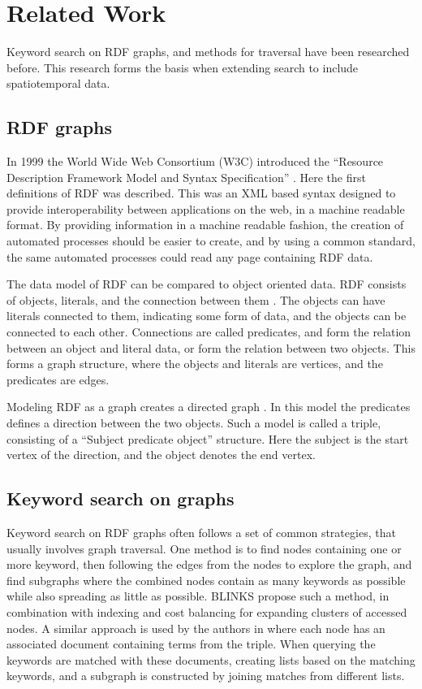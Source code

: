 \chapter{Related Work}
\label{cha:related_work}
Keyword search on RDF graphs, and methods for traversal have been researched before. This research forms the basis when extending search to include spatiotemporal data.

\section{RDF graphs}
In 1999 the World Wide Web Consortium (W3C) introduced the ``Resource Description Framework Model and Syntax Specification'' \cite{brickley1999resource}. Here the first definitions of RDF was described. This was an XML based syntax designed to provide interoperability between applications on the web, in a machine readable format. By providing information in a machine readable fashion, the creation of automated processes should be easier to create, and by using a common standard, the same automated processes could read any page containing RDF data.

The data model of RDF can be compared to object oriented data. RDF consists of objects, literals, and the connection between them \cite{decker2000framework}. The objects can have literals connected to them, indicating some form of data, and the objects can be connected to each other. Connections are called predicates, and form the relation between an object and literal data, or form the relation between two objects. This forms a graph structure, where the objects and literals are vertices, and the predicates are edges.

Modeling RDF as a graph creates a directed graph \cite{mcbride2002jena}. In this model the predicates defines a direction between the two objects. Such a model is called a triple, consisting of a ``Subject predicate object'' structure\cite{decker2000framework}. Here the subject is the start vertex of the direction, and the object denotes the end vertex.

\section{Keyword search on graphs}
Keyword search on RDF graphs often follows a set of common strategies, that usually involves graph traversal. One method is to find nodes containing one or more keyword, then following the edges from the nodes to explore the graph, and find subgraphs where the combined nodes contain as many keywords as possible while also spreading as little as possible. BLINKS \citep{blinks} propose such a method, in combination with indexing and cost balancing for expanding clusters of accessed nodes. A similar approach is used by the authors in \citep{Elbassuoni:2011:KSO:2063576.2063615} where each node has an associated document containing terms from the triple. When querying the keywords are matched with these documents, creating lists based on the matching keywords, and a subgraph is constructed by joining matches from different lists.

